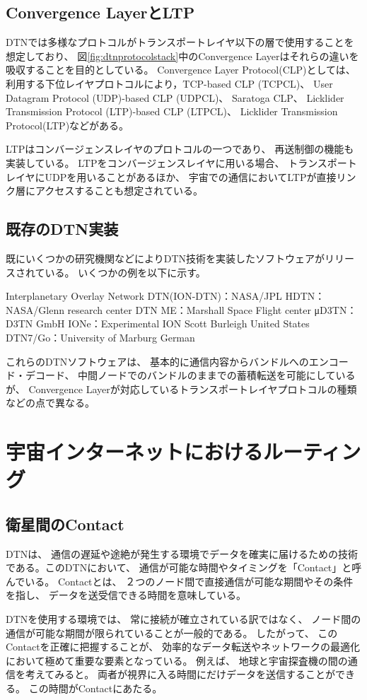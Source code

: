 \subsection{Convergence LayerとLTP}
DTNでは多様なプロトコルがトランスポートレイヤ以下の層で使用することを想定しており、 図\ref{fig:dtnprotocolstack}中のConvergence Layerはそれらの違いを吸収することを目的としている。 Convergence Layer Protocol(CLP)としては、 利用する下位レイヤプロトコルにより，TCP-based CLP (TCPCL)、 User Datagram Protocol (UDP)-based CLP (UDPCL)、 Saratoga CLP、 Licklider Transmission Protocol (LTP)-based CLP (LTPCL)、 Licklider Transmission Protocol(LTP)などがある。 

LTP\cite{rfc5326}はコンバージェンスレイヤのプロトコルの一つであり、 再送制御の機能も実装している。 LTPをコンバージェンスレイヤに用いる場合、 トランスポートレイヤにUDPを用いることがあるほか、 宇宙での通信においてLTPが直接リンク層にアクセスすることも想定されている。
\subsection{既存のDTN実装}
既にいくつかの研究機関などによりDTN技術を実装したソフトウェアがリリースされている。 いくつかの例を以下に示す。 

Interplanetary Overlay Network DTN(ION-DTN)：NASA/JPL
HDTN：NASA/Glenn research center
DTN ME：Marshall Space Flight center
μD3TN：D3TN GmbH
IONe：Experimental ION Scott Burleigh United States 
DTN7/Go：University of Marburg German

これらのDTNソフトウェアは、 基本的に通信内容からバンドルへのエンコード・デコード、 中間ノードでのバンドルのままでの蓄積転送を可能にしているが、 Convergence Layerが対応しているトランスポートレイヤプロトコルの種類などの点で異なる。 


\section{宇宙インターネットにおけるルーティング}
\subsection{衛星間のContact}
DTNは、 通信の遅延や途絶が発生する環境でデータを確実に届けるための技術である。このDTNにおいて、 通信が可能な時間やタイミングを「Contact」と呼んでいる。 Contactとは、 ２つのノード間で直接通信が可能な期間やその条件を指し、 データを送受信できる時間を意味している。

DTNを使用する環境では、 常に接続が確立されている訳ではなく、 ノード間の通信が可能な期間が限られていることが一般的である。 したがって、 このContactを正確に把握することが、 効率的なデータ転送やネットワークの最適化において極めて重要な要素となっている。 例えば、 地球と宇宙探査機の間の通信を考えてみると。 両者が視界に入る時間にだけデータを送信することができる。 この時間がContactにあたる。 

